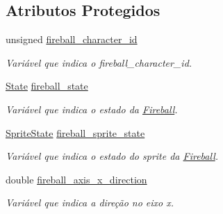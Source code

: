 \subsection*{Atributos Protegidos}
\begin{DoxyCompactItemize}
\item 
\mbox{\label{classFireball_a84186298340b89e4255ef0bc2bbf4e88}} 
unsigned \mbox{\hyperlink{classFireball_a84186298340b89e4255ef0bc2bbf4e88}{fireball\+\_\+character\+\_\+id}}
\begin{DoxyCompactList}\small\item\em Variável que indica o fireball\+\_\+character\+\_\+id. \end{DoxyCompactList}\item 
\mbox{\label{classFireball_a68da1f63b2154ecb1d14706d410245ee}} 
\mbox{\hyperlink{classFireball_a70306ad9672fafa625fe67c7895cca38}{State}} \mbox{\hyperlink{classFireball_a68da1f63b2154ecb1d14706d410245ee}{fireball\+\_\+state}}
\begin{DoxyCompactList}\small\item\em Variável que indica o estado da \mbox{\hyperlink{classFireball}{Fireball}}. \end{DoxyCompactList}\item 
\mbox{\label{classFireball_aacb9344cf4e34345774f518faec82425}} 
\mbox{\hyperlink{classFireball_a5bac3189f4a2d9d0fd1862f77fc8a29d}{Sprite\+State}} \mbox{\hyperlink{classFireball_aacb9344cf4e34345774f518faec82425}{fireball\+\_\+sprite\+\_\+state}}
\begin{DoxyCompactList}\small\item\em Variável que indica o estado do sprite da \mbox{\hyperlink{classFireball}{Fireball}}. \end{DoxyCompactList}\item 
\mbox{\label{classFireball_af8bd0c78844e754f32f86362f659d875}} 
double \mbox{\hyperlink{classFireball_af8bd0c78844e754f32f86362f659d875}{fireball\+\_\+axis\+\_\+x\+\_\+direction}}
\begin{DoxyCompactList}\small\item\em Variável que indica a direção no eixo x. \end{DoxyCompactList}\item 
\mbox{\label{classFireball_a1d912b1e4229e9de2864024fc8b7f0a9}} 

\end{DoxyCompactItemize}
